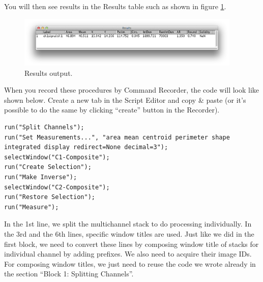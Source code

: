 You will then see results in the Results table such as shown in figure \ref{fig_NucRimMeasureResults}.

\begin{figure}[h!]
\begin{center}
\includegraphics[width=0.95\textwidth]{fig/MeasurementResults.png}
\caption{Results output.}
\label{fig_NucRimMeasureResults}
\end{center}
\end{figure}

When you record these procedures by Command Recorder, the code will look like shown below. Create a new tab in the Script Editor and copy \& paste (or it's possible to do the same by clicking ``create'' button in the Recorder).

\begin{lstlisting}
run("Split Channels");
run("Set Measurements...", "area mean centroid perimeter shape integrated display redirect=None decimal=3");
selectWindow("C1-Composite");
run("Create Selection");
run("Make Inverse");
selectWindow("C2-Composite");
run("Restore Selection");
run("Measure");
\end{lstlisting}

In the 1st line, we split the multichannel stack to do processing individually. In the 3rd and the 6th lines, specific window titles are used. Just like we did in the first block, we need to convert these lines by composing window title of stacks for individual channel by adding prefixes. We also need to acquire their image IDs. For composing window titles, we just need to reuse the code we wrote already in the section ``Block 1: Splitting Channels''. 






